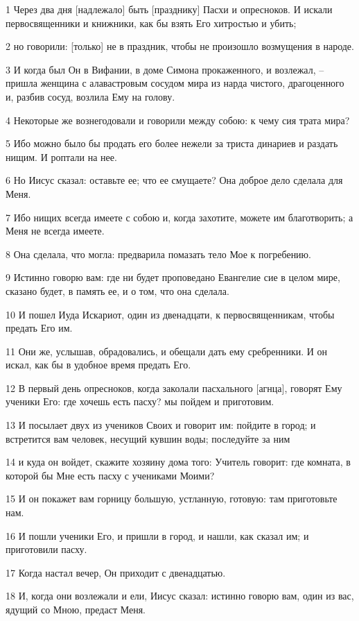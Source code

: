 \par 1 Через два дня [надлежало] быть [празднику] Пасхи и опресноков. И искали первосвященники и книжники, как бы взять Его хитростью и убить;
\par 2 но говорили: [только] не в праздник, чтобы не произошло возмущения в народе.
\par 3 И когда был Он в Вифании, в доме Симона прокаженного, и возлежал, --пришла женщина с алавастровым сосудом мира из нарда чистого, драгоценного и, разбив сосуд, возлила Ему на голову.
\par 4 Некоторые же вознегодовали и говорили между собою: к чему сия трата мира?
\par 5 Ибо можно было бы продать его более нежели за триста динариев и раздать нищим. И роптали на нее.
\par 6 Но Иисус сказал: оставьте ее; что ее смущаете? Она доброе дело сделала для Меня.
\par 7 Ибо нищих всегда имеете с собою и, когда захотите, можете им благотворить; а Меня не всегда имеете.
\par 8 Она сделала, что могла: предварила помазать тело Мое к погребению.
\par 9 Истинно говорю вам: где ни будет проповедано Евангелие сие в целом мире, сказано будет, в память ее, и о том, что она сделала.
\par 10 И пошел Иуда Искариот, один из двенадцати, к первосвященникам, чтобы предать Его им.
\par 11 Они же, услышав, обрадовались, и обещали дать ему сребренники. И он искал, как бы в удобное время предать Его.
\par 12 В первый день опресноков, когда заколали пасхального [агнца], говорят Ему ученики Его: где хочешь есть пасху? мы пойдем и приготовим.
\par 13 И посылает двух из учеников Своих и говорит им: пойдите в город; и встретится вам человек, несущий кувшин воды; последуйте за ним
\par 14 и куда он войдет, скажите хозяину дома того: Учитель говорит: где комната, в которой бы Мне есть пасху с учениками Моими?
\par 15 И он покажет вам горницу большую, устланную, готовую: там приготовьте нам.
\par 16 И пошли ученики Его, и пришли в город, и нашли, как сказал им; и приготовили пасху.
\par 17 Когда настал вечер, Он приходит с двенадцатью.
\par 18 И, когда они возлежали и ели, Иисус сказал: истинно говорю вам, один из вас, ядущий со Мною, предаст Меня.
